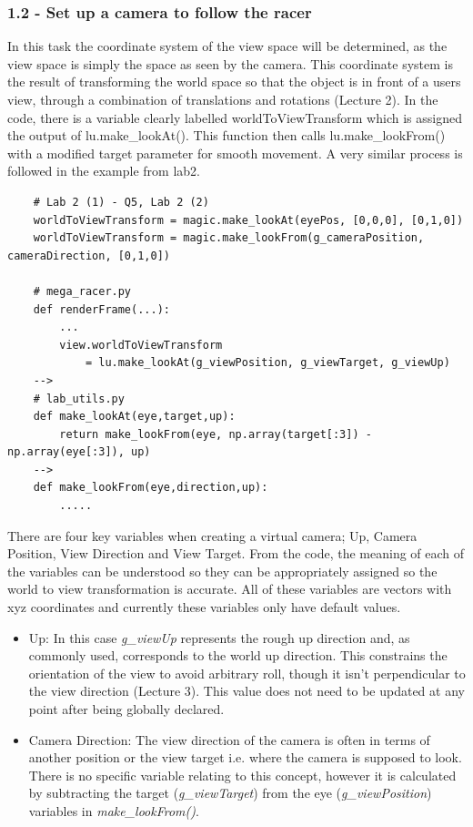 \documentclass[a4 paper, 12pt]{article}
\begin{document}
\subsubsection{1.2 - Set up a camera to follow the racer}
In this task the coordinate system of the view space will be determined, as the view space is simply the space as seen by the camera. This coordinate system is the result of transforming the world space so that the object is in front of a users view, through a combination of translations and rotations (Lecture 2). In the code, there is a variable clearly labelled worldToViewTransform which is assigned the output of lu.make\_lookAt(). This function then calls lu.make\_lookFrom() with a modified target parameter for smooth movement. A very similar process is followed in the example from lab2. 
    \begin{lstlisting}
    # Lab 2 (1) - Q5, Lab 2 (2) 
    worldToViewTransform = magic.make_lookAt(eyePos, [0,0,0], [0,1,0])
    worldToViewTransform = magic.make_lookFrom(g_cameraPosition, cameraDirection, [0,1,0])

    # mega_racer.py 
    def renderFrame(...):
        ...
        view.worldToViewTransform 
            = lu.make_lookAt(g_viewPosition, g_viewTarget, g_viewUp)
    -->
    # lab_utils.py
    def make_lookAt(eye,target,up):
        return make_lookFrom(eye, np.array(target[:3]) - np.array(eye[:3]), up)
    --> 
    def make_lookFrom(eye,direction,up):
        .....
    \end{lstlisting}

There are four key variables when creating a virtual camera; Up, Camera Position, View Direction and View Target. From the code, the meaning of each of the variables can be understood so they can be appropriately assigned so the world to view transformation is accurate. All of these variables are vectors with xyz coordinates and currently these variables only have default values.
    \begin{itemize}
        \item Up: In this case \textit{g\_viewUp} represents the rough up direction and, as commonly used, corresponds to the world up direction. This constrains the orientation of the view to avoid arbitrary roll, though it isn't perpendicular to the view direction (Lecture 3). This value does not need to be updated at any point after being globally declared.
        \item Camera Direction: The view direction of the camera is often in terms of another position or the view target i.e. where the camera is supposed to look. There is no specific variable relating to this concept, however it is calculated by subtracting the target (\textit{g\_viewTarget}) from the eye (\textit{g\_viewPosition}) variables in \textit{make\_lookFrom()}.
    \end{itemize}
\end{document}

